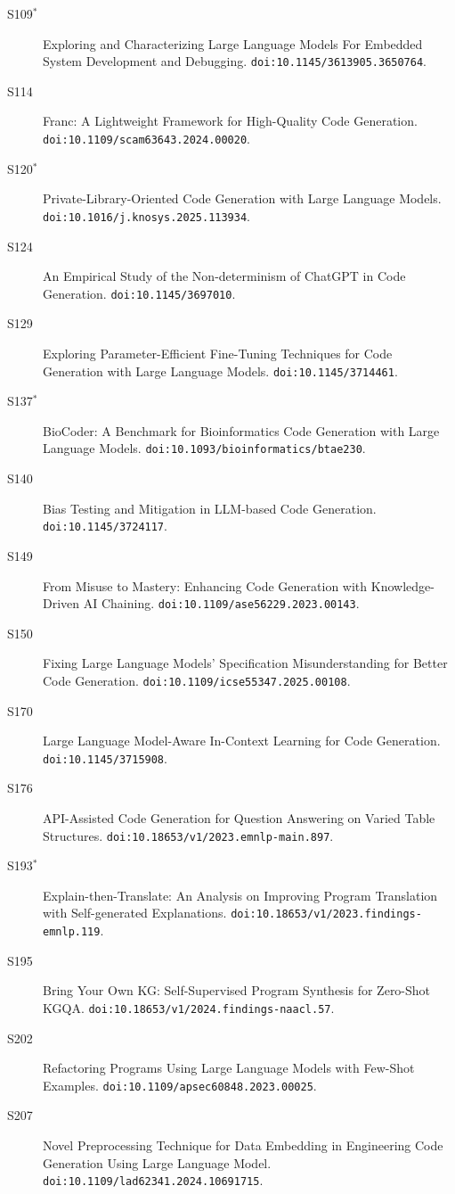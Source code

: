 {\begin{description}
\item[S109$^\ast$] Exploring and Characterizing Large Language Models For Embedded System Development and Debugging. \texttt{doi:10.1145/3613905.3650764}.
\item[S114] Franc: A Lightweight Framework for High-Quality Code Generation. \texttt{doi:10.1109/scam63643.2024.00020}.
\item[S120$^\ast$] Private-Library-Oriented Code Generation with Large Language Models. \texttt{doi:10.1016/j.knosys.2025.113934}.
\item[S124] An Empirical Study of the Non-determinism of ChatGPT in Code Generation. \texttt{doi:10.1145/3697010}.
\item[S129] Exploring Parameter-Efficient Fine-Tuning Techniques for Code Generation with Large Language Models. \texttt{doi:10.1145/3714461}.
\item[S137$^\ast$] BioCoder: A Benchmark for Bioinformatics Code Generation with Large Language Models. \texttt{doi:10.1093/bioinformatics/btae230}.
\item[S140] Bias Testing and Mitigation in LLM-based Code Generation. \texttt{doi:10.1145/3724117}.
\item[S149] From Misuse to Mastery: Enhancing Code Generation with Knowledge-Driven AI Chaining. \texttt{doi:10.1109/ase56229.2023.00143}.
\item[S150] Fixing Large Language Models' Specification Misunderstanding for Better Code Generation. \texttt{doi:10.1109/icse55347.2025.00108}.
\item[S170] Large Language Model-Aware In-Context Learning for Code Generation. \texttt{doi:10.1145/3715908}.
\item[S176] API-Assisted Code Generation for Question Answering on Varied Table Structures. \texttt{doi:10.18653/v1/2023.emnlp-main.897}.
\item[S193$^\ast$] Explain-then-Translate: An Analysis on Improving Program Translation with Self-generated Explanations. \texttt{doi:10.18653/v1/2023.findings-emnlp.119}.
\item[S195] Bring Your Own KG: Self-Supervised Program Synthesis for Zero-Shot KGQA. \texttt{doi:10.18653/v1/2024.findings-naacl.57}.
\item[S202] Refactoring Programs Using Large Language Models with Few-Shot Examples. \texttt{doi:10.1109/apsec60848.2023.00025}.
\item[S207] Novel Preprocessing Technique for Data Embedding in Engineering Code Generation Using Large Language Model. \texttt{doi:10.1109/lad62341.2024.10691715}.

\end{description}}
